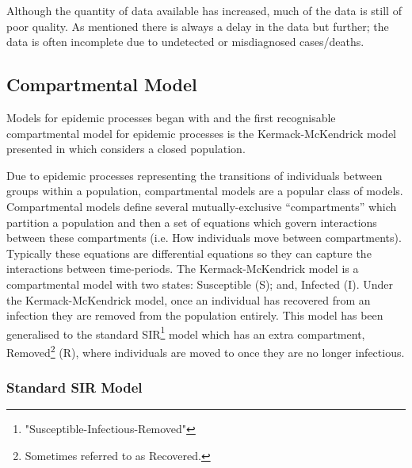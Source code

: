 \documentclass[11pt,a4paper]{article}
\theoremstyle{break}
\begin{document}
  \par Although the quantity of data available has increased, much of the data is still of poor quality. As mentioned there is always a delay in the data but further; the data is often incomplete due to undetected or misdiagnosed cases/deaths.

\subsection{Compartmental Model}\label{sec_compartmental_models}

  \par Models for epidemic processes began with \cite[]{application_of_the_theory_of_probabilities_to_the_study_of_a_prior_pathometry_part_i,application_of_the_theory_of_probabilities_to_the_study_of_a_prior_pathometry_part_ii} and the first recognisable compartmental model for epidemic processes is the Kermack-McKendrick model presented in \cite[]{contribution_to_the_mathematical_theory_of_epidemics} which considers a closed population.

  \par Due to epidemic processes representing the transitions of individuals between groups within a population, compartmental models are a popular class of models. Compartmental models define several mutually-exclusive ``compartments'' which partition a population and then a set of equations which govern interactions between these compartments (i.e. How individuals move between compartments). Typically these equations are differential equations so they can capture the interactions between time-periods. The Kermack-McKendrick model is a compartmental model with two states: Susceptible (S); and, Infected (I). Under the Kermack-McKendrick model, once an individual has recovered from an infection they are removed from the population entirely. This model has been generalised to the standard SIR\footnote{"Susceptible-Infectious-Removed"} model which has an extra compartment, Removed\footnote{Sometimes referred to as Recovered.} (R), where individuals are moved to once they are no longer infectious.

\subsubsection{Standard SIR Model}\label{sec_standard_sir_model}

\end{document}
